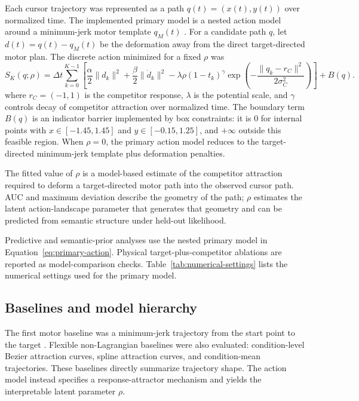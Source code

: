 \documentclass[11pt,final]{article}
\begin{document}
Each cursor trajectory was represented as a path $q(t)=(x(t),y(t))$ over normalized time. The implemented primary model is a nested action model around a minimum-jerk motor template $q_M(t)$ \citep{flash1985coordination}. For a candidate path $q$, let $d(t)=q(t)-q_M(t)$ be the deformation away from the direct target-directed motor plan. The discrete action minimized for a fixed $\rho$ was
\begin{equation}
S_K(q;\rho)=
\Delta t \sum_{k=0}^{K-1}
\left[
\frac{\alpha}{2}\|d_k\|^2+
\frac{\beta}{2}\|\ddot d_k\|^2
- \lambda \rho (1-t_k)^\gamma
\exp\left(-\frac{\|q_k-r_C\|^2}{2\sigma_C^2}\right)
\right] + B(q).
\label{eq:primary-action}
\end{equation}
where $r_C=(-1,1)$ is the competitor response, $\lambda$ is the potential scale, and $\gamma$ controls decay of competitor attraction over normalized time. The boundary term $B(q)$ is an indicator barrier implemented by box constraints: it is 0 for internal points with $x\in[-1.45,1.45]$ and $y\in[-0.15,1.25]$, and $+\infty$ outside this feasible region. When $\rho=0$, the primary action model reduces to the target-directed minimum-jerk template plus deformation penalties.

The fitted value of $\rho$ is a model-based estimate of the competitor attraction required to deform a target-directed motor path into the observed cursor path. AUC and maximum deviation describe the geometry of the path; $\rho$ estimates the latent action-landscape parameter that generates that geometry and can be predicted from semantic structure under held-out likelihood.

Predictive and semantic-prior analyses use the nested primary model in Equation~\ref{eq:primary-action}. Physical target-plus-competitor ablations are reported as model-comparison checks. Table~\ref{tab:numerical-settings} lists the numerical settings used for the primary model.



\subsection{Baselines and model hierarchy}

The first motor baseline was a minimum-jerk trajectory from the start point to the target \citep{flash1985coordination}. Flexible non-Lagrangian baselines were also evaluated: condition-level Bezier attraction curves, spline attraction curves, and condition-mean trajectories. These baselines directly summarize trajectory shape. The action model instead specifies a response-attractor mechanism and yields the interpretable latent parameter $\rho$.
\end{document}
